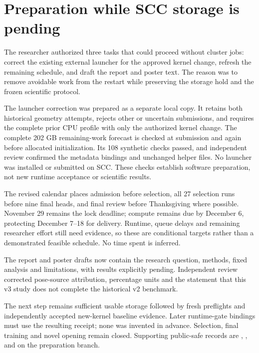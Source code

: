 \section{Preparation while SCC storage is pending}

The researcher authorized three tasks that could proceed without cluster
jobs: correct the existing external launcher for the approved kernel change,
refresh the remaining schedule, and draft the report and poster text. The
reason was to remove avoidable work from the restart while preserving the
storage hold and the frozen scientific protocol.

The launcher correction was prepared as a separate local copy. It retains
both historical geometry attempts, rejects other or uncertain submissions,
and requires the complete prior CPU profile with only the authorized kernel
change. The complete 202 GB remaining-work forecast is checked at submission
and again before allocated initialization. Its 108 synthetic checks passed,
and independent review confirmed the metadata bindings and unchanged helper
files. No launcher was installed or submitted on SCC. These checks establish
software preparation, not new runtime acceptance or scientific results.

The revised calendar places admission before selection, all 27 selection
runs before nine final heads, and final review before Thanksgiving where
possible. November 29 remains the lock deadline; compute remains due by
December 6, protecting December 7--18 for delivery. Runtime, queue delays and
remaining researcher effort still need evidence, so these are conditional
targets rather than a demonstrated feasible schedule. No time spent is inferred.

The report and poster drafts now contain the research question, methods,
fixed analysis and limitations, with results explicitly pending. Independent
review corrected pose-source attribution, percentage units and the statement
that this v3 study does not complete the historical v2 benchmark.

The next step remains sufficient usable storage followed by fresh preflights
and independently accepted new-kernel baseline evidence. Later runtime-gate
bindings must use the resulting receipt; none was invented in advance.
Selection, final training and novel opening remain closed. Supporting public-safe
records are ,
,
 and
 on the preparation branch.

